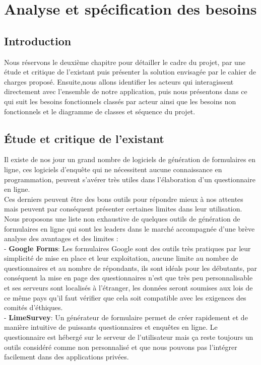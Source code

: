 \chapter{Analyse et spécification des besoins}

\section{Introduction}
Nous réservons le deuxième chapitre pour détailler le cadre du projet, par une étude et critique de l’existant puis présenter la solution envisagée par le cahier de charges proposé.
Ensuite,nous allons identifier les acteurs qui interagissent directement avec l’ensemble de notre application, puis nous présentons dans ce qui suit les besoins fonctionnels classés par acteur ainsi que les besoins non fonctionnels et le diagramme de classes et séquence du projet.
\section{\'Etude et critique de l'existant}
Il existe de nos jour un grand nombre de logiciels de génération de formulaires en ligne, ces  logiciels d’enquête  qui ne nécessitent aucune connaissance en programmation, peuvent s’avérer très utiles dans l’élaboration d’un questionnaire en ligne.\\
Ces derniers peuvent être des bons outils pour répondre mieux à nos attentes mais peuvent par conséquent présenter certaines limites dans leur utilisation.\\
Nous proposons une liste non exhaustive de quelques outils de génération de formulaires en ligne qui sont les leaders dans le marché accompagnée d'une brève analyse des avantages et des limites :\\
- \textbf{Google Forms}: Les formulaires Google sont des outils très pratiques par leur simplicité de mise en place et leur exploitation, aucune limite au nombre de questionnaires et au nombre de répondants, ils sont idéals pour les débutants, par conséquent la mise en page des questionnaires n’est que très peu personnalisable et ses serveurs sont localisés à l’étranger, les données seront soumises aux lois de ce même pays qu'il faut vérifier que cela soit compatible avec les exigences des comités d'éthiques.\\%
- \textbf{LimeSurvey}: Un générateur de formulaire permet de créer rapidement et de manière intuitive de puissants questionnaires et enquêtes en ligne. Le questionnaire est hébergé sur le serveur de l’utilisateur mais ça reste toujours un outils considéré comme non personnalisé et que nous pouvons pas l'intégrer facilement dans des applications privées. 

